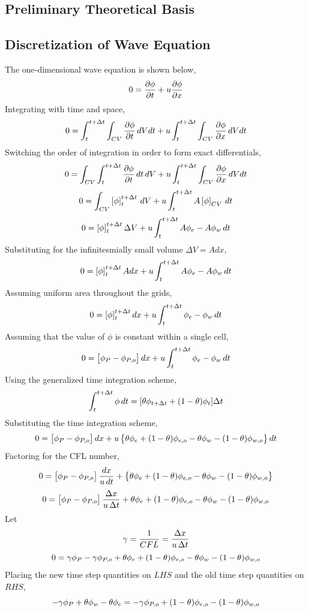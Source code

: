 \documentclass[class=report, 12pt, crop=false]{standalone}
\begin{document}
\begin{center}

\section{Preliminary Theoretical Basis}

\subsection{Discretization of Wave Equation}
The one-dimensional wave equation is shown below,
$$0 = \frac{\partial\phi}{\partial t} + u\frac{\partial\phi}{\partial x}$$
Integrating with time and space,
$$0 = \int^{t+\Delta t}_{t}\int_{CV} \frac{\partial\phi}{\partial t} \,dVdt + u\int^{t+\Delta t}_{t}\int_{CV}\frac{\partial\phi}{\partial x}\,dVdt$$
Switching the order of integration in order to form exact differentials,
$$0 = \int_{CV}\int^{t+\Delta t}_{t} \frac{\partial\phi}{\partial t} \,dt\,dV + u\int^{t+\Delta t}_{t}\int_{CV}\frac{\partial\phi}{\partial x}\,dVdt$$
$$0 = \int_{CV}\left[\phi\right]^{t+\Delta t}_{t} \,dV + u\int^{t+\Delta t}_{t}A\left[\phi\right]_{CV}\,dt$$
$$0 = \left[\phi\right]^{t+\Delta t}_{t}\Delta V  + u\int^{t+\Delta t}_{t}A\phi_{e} - A\phi_{w}\,dt$$
Substituting for the infinitesmially small volume $\Delta V = A dx$,
$$0 = \left[\phi\right]^{t+\Delta t}_{t}A dx  + u\int^{t+\Delta t}_{t}A\phi_{e} - A\phi_{w}\,dt$$
Assuming uniform area throughout the grids,
$$0 = \left[\phi\right]^{t+\Delta t}_{t} dx  + u\int^{t+\Delta t}_{t}\phi_{e} - \phi_{w}\,dt$$
Assuming that the value of $\phi$ is constant within a single cell,
$$0 = \left[\phi_{P} - \phi_{P,o}\right] dx  + u\int^{t+\Delta t}_{t}\phi_{e} - \phi_{w}\,dt$$
Using the generalized time integration scheme,
$$\int^{t+\Delta t}_{t} \phi\,dt = [\theta\phi_{t+\Delta t} + (1-\theta)\phi_{t}]\Delta t$$
Substituting the time integration scheme,
$$0 = \left[\phi_{P} - \phi_{P,o}\right] dx  + u\left\{\theta\phi_{e} + (1-\theta)\phi_{e,o} - \theta\phi_{w} - (1-\theta)\phi_{w,o}\right\}dt$$
Factoring for the CFL number,
$$0 = \left[\phi_{P} - \phi_{P,o}\right] \frac{dx}{u\,dt}  + \left\{\theta\phi_{e} + (1-\theta)\phi_{e,o} - \theta\phi_{w} - (1-\theta)\phi_{w,o}\right\}$$
$$0 = \left[\phi_{P} - \phi_{P,o}\right] \frac{\Delta x}{u\,\Delta t}  + \theta\phi_{e} + (1-\theta)\phi_{e,o} - \theta\phi_{w} - (1-\theta)\phi_{w,o}$$
Let 
$$\gamma = \frac{1}{CFL} = \frac{\Delta x}{u\,\Delta t}$$
$$0 = \gamma\phi_{P} - \gamma\phi_{P,o}   + \theta\phi_{e} + (1-\theta)\phi_{e,o} - \theta\phi_{w} - (1-\theta)\phi_{w,o}$$
Placing the new time step quantities on $LHS$ and the old time step quantities on $RHS$,
$$-\gamma\phi_{P} + \theta\phi_{w} - \theta\phi_{e} = - \gamma\phi_{P,o} + (1-\theta)\phi_{e,o} - (1-\theta)\phi_{w,o}$$

\end{center}
\end{document}
